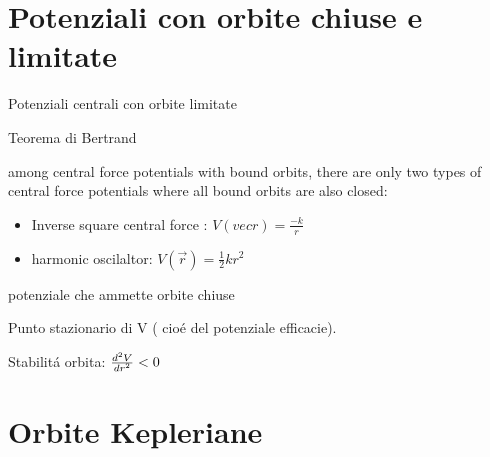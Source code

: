 \section{Potenziali con orbite chiuse e limitate}

\begin{frame}{Potenziali centrali con orbite limitate}

\begin{block}{Teorema di Bertrand}

among central force potentials with bound orbits, there are only two types of central force potentials where all bound orbits are also closed:

\begin{itemize}

\item Inverse square central force : $V(vec{r})=\frac{-k}{r}$

\item harmonic oscilaltor: $V(\vec{r})=\frac{1}{2}kr^2$

\end{itemize}

\end{block}

\end{frame}

\begin{wordonframe}{potenziale che ammette orbite chiuse}

Punto stazionario di V ( cio\'e del potenziale efficacie).

Stabilit\'a orbita: $\TtwoDy{r}{V}<0$

\end{wordonframe}

\section{Orbite Kepleriane}

